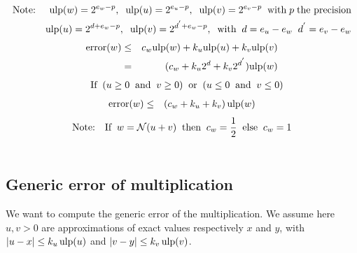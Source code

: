 \documentclass[12pt]{amsart}
\def\ulp{{\rm ulp}}
\def\N{{\mathcal N}}
\DeclareMathOperator{\error}{error}
\begin{document}
\begin{eqnarray}\nonumber
\textnormal{Note:}&& \ulp(w)=2^{e_w-p}, \;\; \ulp(u)=2^{e_u-p},\;\; \ulp(v)=2^{e_v-p}\;\;\textnormal{with} \; p \; \textnormal{the precision} \\\nonumber
&& \ulp(u)=2^{d+e_w-p}, \;\; \ulp(v)=2^{d^{'}+e_w-p},\;\;\textnormal{with} \;\;d=e_u-e_w \;\; d^{'}=e_v-e_w
\end{eqnarray}
\begin{eqnarray}\nonumber
\error(w)& \leq &c_w \ulp(w) + k_u \ulp(u) + k_v \ulp(v) \\\nonumber
&=&(c_w+k_u 2^d+ k_v 2^{d^{'}}) \ulp(w)
\end{eqnarray}
\begin{eqnarray}\nonumber
&&\textnormal{If} \;\; ( u \geq 0  \;\;\textnormal{and}\;\;  v \geq 0) \;\;\textnormal{or}\;\; (u \leq 0 \;\;\textnormal{and}\;\; v \leq 0)
\end{eqnarray}
\begin{eqnarray}\nonumber
\error(w)& \leq&(c_w + k_u + k_v) \, \ulp(w)
\end{eqnarray}
\begin{eqnarray}\nonumber
\textnormal{Note:}&&\textnormal{If}\;\; w=\N(u+v) \;\;\textnormal{then}\;\; c_w =\frac{1}{2} \;\;\textnormal{else}\;\; c_w =1\\\nonumber
\end{eqnarray}

\subsection{Generic error of multiplication}\label{generic:mul}

We want to compute the generic error of the multiplication.
We assume here $u, v > 0$ are approximations of exact values respectively $x$
and $y$, with $|u - x| \leq k_u \, \ulp(u)$ and $|v - y| \leq k_v \, \ulp(v)$.
\end{document}
